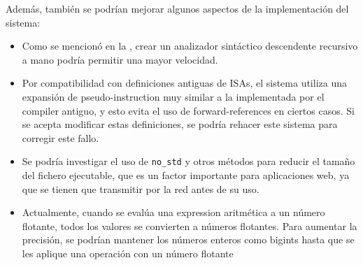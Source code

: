 \noindent
Además, también se podrían mejorar algunos aspectos de la implementación del
sistema:

\begin{itemize}
    \item Como se mencionó en la , crear un analizador
    sintáctico descendente recursivo a mano podría permitir una mayor velocidad.
    \item Por compatibilidad con definiciones antiguas de \glspl{ISA}, el
    sistema utiliza una expansión de \gls{pseudo-instruction} muy similar a la
    implementada por el \gls{compiler} antiguo, y esto evita el uso de
    \glspl{forward-reference} en ciertos casos. Si se acepta modificar estas
    definiciones, se podría rehacer este sistema para corregir este fallo.
    \item Se podría investigar el uso de \verb!no_std! \parencite{no-std} y
    otros métodos para reducir el tamaño del fichero ejecutable, que es un
    factor importante para aplicaciones web, ya que se tienen que transmitir por
    la red antes de su uso.
    \item Actualmente, cuando se evalúa una \gls{expression} aritmética a un
    número flotante, todos los valores se convierten a números flotantes. Para
    aumentar la precisión, se podrían mantener los números enteros como
    \glspl{bigint} hasta que se les aplique una operación con un número flotante
\end{itemize}
